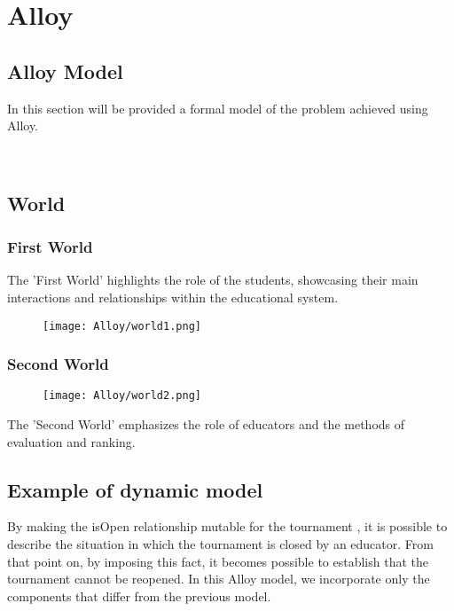 \section{Alloy}
\subsection{Alloy Model}
In this section will be provided a formal model of the problem achieved using Alloy.

\\

\subsection{World}
\subsubsection{First World}
The 'First World' highlights the role of the students, showcasing their main interactions and relationships within the educational system.
 \begin{figure}[H]
  \texttt{[image: Alloy/world1.png]} 
  \label{fig:immagine}
\end{figure}

\subsubsection{Second World}
 \begin{figure}[H]
  \texttt{[image: Alloy/world2.png]} 
  \label{fig:immagine}
\end{figure}
The 'Second World' emphasizes the role of educators and the methods of evaluation and ranking.

\subsection{Example of dynamic model}
By making the isOpen relationship mutable for the tournament , it is possible to describe the situation in which the tournament is closed by an educator. From that point on, by imposing this fact, it becomes possible to establish that the tournament cannot be reopened. In this Alloy model, we incorporate only the components that differ from the previous model.

